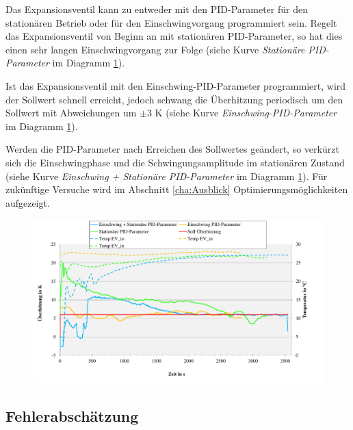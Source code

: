 Das Expansionsventil kann zu entweder mit den PID-Parameter für den stationären Betrieb oder für den Einschwingvorgang programmiert sein. Regelt das Expansionsventil von Beginn an mit stationären PID-Parameter, so hat dies einen sehr langen Einschwingvorgang zur Folge (siehe Kurve \textit{Stationäre PID-Parameter} im Diagramm \ref{fig:EV_Vergleich}).

Ist das Expansionsventil mit den Einschwing-PID-Parameter programmiert, wird der Sollwert schnell erreicht, jedoch schwang die Überhitzung periodisch um den Sollwert mit Abweichungen um $\pm 3$ K (siehe Kurve \textit{Einschwing-PID-Parameter} im Diagramm \ref{fig:EV_Vergleich}). 

Werden die PID-Parameter nach Erreichen des Sollwertes geändert, so verkürzt sich die Einschwingphase und die Schwingungsamplitude im stationären Zustand (siehe Kurve \textit{Einschwing + Stationäre PID-Parameter} im Diagramm \ref{fig:EV_Vergleich}). Für zukünftige Versuche wird im Abschnitt \ref{cha:Ausblick} Optimierungsmöglichkeiten aufgezeigt. 

\begin{figure}[htb]
\centering		\includegraphics[page=1,width=1.08\textwidth]{Pictures/Inbetriebnahme/EV_Vergleich.pdf}
\caption{}
\label{fig:EV_Vergleich}
\end{figure}



\subsection{Fehlerabschätzung}
\label{subsec:Fehler}

